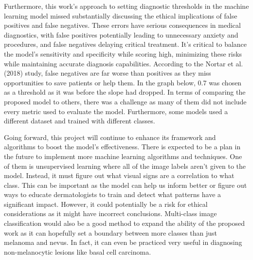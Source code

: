 \documentclass[10pt,twocolumn]{article}
\begin{document}
Furthermore, this work’s approach to setting diagnostic thresholds in the machine learning model missed substantially discussing the ethical implications of false positives and false negatives. These errors have serious consequences in medical diagnostics, with false positives potentially leading to unnecessary anxiety and procedures, and false negatives delaying critical treatment. It's critical to balance the model's sensitivity and specificity while scoring high, minimizing these risks while maintaining accurate diagnosis capabilities. According to the Nortar et al. (2018) study, false negatives are far worse than positives as they miss opportunities to save patients or help them. In the graph below, 0.7 was chosen as a threshold as it was before the slope had dropped. In terms of comparing the proposed model to others, there was a challenge as many of them did not include every metric used to evaluate the model. Furthermore, some models used a different dataset and trained with different classes. \newline

Going forward, this project will continue to enhance its framework and algorithms to boost the model's effectiveness. There is expected to be a plan in the future to implement more machine learning algorithms and techniques. One of them is unsupervised learning where all of the image labels aren’t given to the model. Instead, it must figure out what visual signs are a correlation to what class. This can be important as the model can help us inform better or figure out ways to educate dermatologists to train and detect what patterns have a significant impact. However, it could potentially be a risk for ethical considerations as it might have incorrect conclusions. Multi-class image classification would also be a good method to expand the ability of the proposed work as it can hopefully set a boundary between more classes than just melanoma and nevus. In fact, it can even be practiced very useful in diagnosing non-melanocytic lesions like basal cell carcinoma. 
\end{document}
